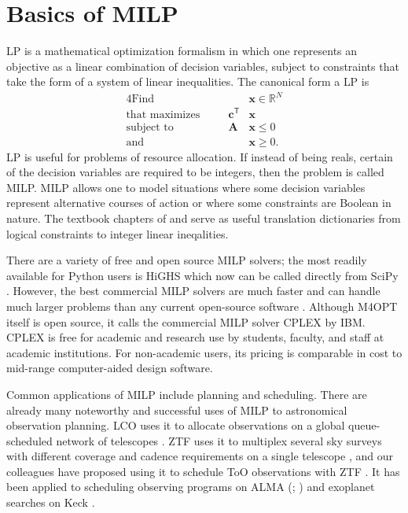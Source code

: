 \documentclass[twocolumn,times]{aastex631}
\begin{document}
\section{Basics of MILP}

\Ac{LP} is a mathematical optimization formalism in which one represents an objective as a linear combination of decision variables, subject to constraints that take the form of a system of linear inequalities. The canonical form a \ac{LP} is
%
\begin{alignat*}{4}
    \text{Find}\quad && &\mathbf{x} \in \mathbb{R}^N \\
    \text{that maximizes}\quad && \mathbf{c}^\mathsf{T} &\mathbf{x} \\
    \text{subject to}\quad && \mathbf{A} &\mathbf{x} \leq 0 \\
    \text{and}\quad && &\mathbf{x} \geq 0.
\end{alignat*}
%
\ac{LP} is useful for problems of resource allocation. If instead of being reals, certain of the decision variables are required to be integers, then the problem is called \acf{MILP}. \ac{MILP} allows one to model situations where some decision variables represent alternative courses of action or where some constraints are Boolean in nature. The textbook chapters of \citet{9781118166000.ch3} and \citet{williams2013model} serve as useful translation dictionaries from logical constraints to integer linear ineqalities.

There are a variety of free and open source \ac{MILP} solvers; the most readily available for Python users is HiGHS \citep{huangfu2018parallelizing} which now can be called directly from SciPy \citep{2020NatMe..17..261V}. However, the best commercial \ac{MILP} solvers are much faster and can handle much larger problems than any current open-source software \citep{koch2011miplib,huangfu2018parallelizing}. Although \ac{M4OPT} itself is open source, it calls the commercial \ac{MILP} solver CPLEX by IBM. CPLEX is free for academic and research use by students, faculty, and staff at academic institutions. For non-academic users, its pricing is comparable in cost to mid-range computer-aided design software.

Common applications of \ac{MILP} include planning and scheduling. There are already many noteworthy and successful uses of \ac{MILP} to astronomical observation planning. \ac{LCO} uses it to allocate observations on a global queue-scheduled network of telescopes \citep{2014SPIE.9149E..0ES}. \ac{ZTF} uses it to multiplex several sky surveys with different coverage and cadence requirements on a single telescope \citep{2019PASP..131f8003B}, and our colleagues have proposed using it to schedule \ac{ToO} observations with \ac{ZTF} \citep{2022ApJ...935...87P}. It has been applied to scheduling observing programs on \acl{ALMA} (; \citealt{2016A&C....15...90S}) and exoplanet searches on Keck \citep{2024AJ....167...33H}.
\end{document}
